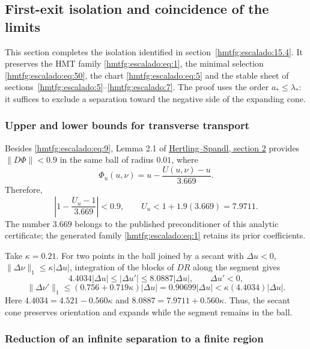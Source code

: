 \subsection{First-exit isolation and coincidence of the limits}
\label{hmtfg:escalado:16}

This section completes the isolation identified in section~\ref{hmtfg:escalado:15.4}. It preserves the HMT family \eqref{hmtfg:escalado:eq:1}, the minimal selection \eqref{hmtfg:escalado:eq:50}, the chart \eqref{hmtfg:escalado:eq:5} and the stable sheet of sections~\ref{hmtfg:escalado:5}--\ref{hmtfg:escalado:7}. The proof uses the order \(a_*\le\lambda_*\): it suffices to exclude a separation toward the negative side of the expanding cone.

\subsubsection{Upper and lower bounds for transverse transport}
\label{hmtfg:escalado:16.1}

Besides \eqref{hmtfg:escalado:eq:9}, Lemma 2.1 of \href{https://arxiv.org/pdf/1410.3277}{Hertling–Spandl, section 2} provides \(\|D\Phi\|<0.9\) in the same ball of radius \(0.01\), where
\[
\Phi_u(u,\nu)=u-\frac{U(u,\nu)-u}{3.669}.
\]
Therefore,
\begin{equation}
\left|1-\frac{U_u-1}{3.669}\right|<0.9,\qquad
U_u<1+1.9(3.669)=7.9711.
\label{hmtfg:escalado:eq:53}
\end{equation}
The number \(3.669\) belongs to the published preconditioner of this analytic certificate; the generated family \eqref{hmtfg:escalado:eq:1} retains its prior coefficients.

Take \(\kappa=0.21\). For two points in the ball joined by a secant with
\(\Delta u<0\), \(\|\Delta\nu\|_1\le\kappa|\Delta u|\), integration of the blocks of \(DR\) along the segment gives
\begin{equation}
4.4034|\Delta u|
\le|\Delta u'|\le8.0887|\Delta u|,\qquad \Delta u'<0,
\label{hmtfg:escalado:eq:54}
\end{equation}
\begin{equation}
\|\Delta\nu'\|_1
\le(0.756+0.719\kappa)|\Delta u|
=0.90699|\Delta u|
<\kappa(4.4034)|\Delta u|.
\label{hmtfg:escalado:eq:55}
\end{equation}
Here \(4.4034=4.521-0.560\kappa\) and \(8.0887=7.9711+0.560\kappa\). Thus, the secant cone preserves orientation and expands while the segment remains in the ball.

\subsubsection{Reduction of an infinite separation to a finite region}
\label{hmtfg:escalado:16.2}

